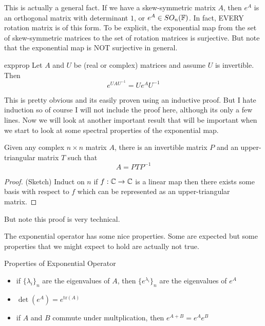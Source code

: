 This is actually a general fact. If we have a skew-symmetric matrix $A$, then $e^A$
is an orthogonal matrix with determinant $1$, or $e^A \in SO_n(\mathbb{F})$. In fact, EVERY
rotation matrix is of this form. To be explicit, the exponential map from the set
of skew-symmetric matrices to the set of rotation matrices is surjective. But note
that the exponential map is NOT surjective in general.

\begin{boxprop}{}{expprop}
    Let $A$ and $U$ be (real or complex) matrices and assume $U$ is invertible.
    Then
    \begin{equation*}
        e^{UAU^{-1}} = Ue^AU^{-1}
    \end{equation*}
\end{boxprop}

This is pretty obvious and its easily proven using an inductive proof. But I hate
induction so of course I will not include the proof here, although its only a few
lines. Now we will look at another important result that will be important when we
start to look at some spectral properties of the exponential map.

\begin{boxprop}{}{}
    Given any complex $n \times n$ matrix $A$, there is an invertible matrix $P$
    and an upper-triangular matrix $T$ such that
    \begin{equation*}
        A = PTP^{-1}
    \end{equation*}

    \begin{proof}
        (Sketch) Induct on $n$ if $f: \mathbb{C} \to \mathbb{C}$ is a linear map then there exists some basis
        with respect to $f$ which can be represented as an upper-triangular matrix.
    \end{proof}

    But note this proof is very technical.
\end{boxprop}

The exponential operator has some nice properties. Some are expected but some
properties that we might expect to hold are actually not true.

\begin{boxprop}{Properties of Exponential Operator}{}

    \begin{itemize}
        \item if $\{ \lambda_i \}_n$ are the eigenvalues of $A$, then $\{e^{\lambda_i}\}_n$
        are the eigenvalues of $e^A$
        \item $\det(e^A) = e^{ \text{tr} (A)}$
        \item if $A$ and $B$ commute under multplication, then $e^{A+B} = e^Ae^B$
    \end{itemize}
\end{boxprop}


